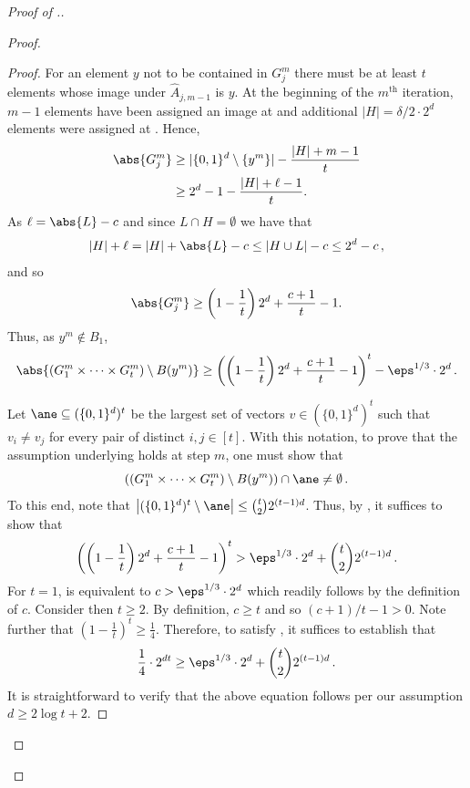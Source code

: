 \documentclass{toc}
\begin{document}
\begin{proof}[Proof of .]
\begin{proof}
\begin{proof}
For an element $y$ not to be contained in $G^m_j$ there must be at least $t$ elements whose image under $\widehat{A}_{j,m-1}$ is $y$. At the beginning of the $m^{\text{th}}$ iteration, $m-1$ elements have been assigned an image at  and additional 
%
%
$|H| = \delta/2 \cdot 2^d$ 
%
elements were assigned at  . Hence,
\begin{align}\label{eq:gm bound}
\abs{G_j^m} &\geq |\{0,1\}^d \setminus \{ y^m\}| - \frac{|H| + m-1}{t} \notag \\
&\ge 2^d -1 - \frac{|H| + \ell-1}{t}. %
%
\end{align}
As
$\ell = \abs{L} - c$ and since $L \cap H = \emptyset$ we have that
\[
|H|+\ell = |H| + \abs{L} - c \le |H \cup L| - c \le 2^d-c\,,
\]
and so
\[
\abs{G_j^m} \ge \left(1-\frac1{t}\right)2^d +  \frac{c+1}{t} -1.%
\]
Thus, as $y^m \not\in B_1$,
\begin{equation}\label{eq:pool}
\abs{\left(G_1^m \times \cdots \times G_t^m\right) \setminus B(y^m)} \ge \left(\left(1-\frac1{t} \right)2^d +  \frac{c+1}{t} -1\right)^t - \eps^{1/3} \cdot 2^d\,.
\end{equation}
%
%



Let $\ane \subseteq (\{0,1\}^d)^t$ be the largest set of vectors $v \in (\{0,1\}^d)^t$ such that $v_i \neq v_j$ for every pair of distinct $i,j \in [t]$. With this notation, to prove that the assumption underlying   holds at step $m$, one must show that
\begin{equation}\label{eq:eqeqeqqeqeqseger}
\left(\left(G_1^m \times \cdots \times G_t^m \right)\setminus B(y^m)\right)\cap \ane \neq \emptyset\,.
\end{equation}
To this end, note that $\left|(\{0,1\}^d)^t \setminus \ane\right| \le \binom{t}{2} 2^{(t-1)d}$. Thus, by , it suffices to show that
\begin{equation}\label{eq:long one}
\left(\left(1-\frac1{t} \right)2^d +  \frac{c+1}{t} -1\right)^t > \eps^{1/3} \cdot 2^d + \binom{t}{2} 2^{(t-1)d}\,. 
\end{equation}
For $t=1$,  is equivalent to
$
c > \eps^{1/3} \cdot 2^d
$
which readily follows by the definition of $c$. Consider then $t \ge 2$. By definition, $c \ge t$ and so %
%
$(c+1)/t-1 > 0$. 
%
Note further that $\left(1-\frac1{t}\right)^t \ge \frac1{4}$. Therefore, to satisfy , it suffices to establish that
\[
\frac1{4} \cdot 2^{dt} \ge \eps^{1/3} \cdot 2^d + \binom{t}{2} 2^{(t-1)d}\,.
\]
It is straightforward to verify that the above equation follows per our assumption $d \ge 2\log{t} + 2$.
\end{proof}



\end{proof}
\end{proof}
\end{document}
